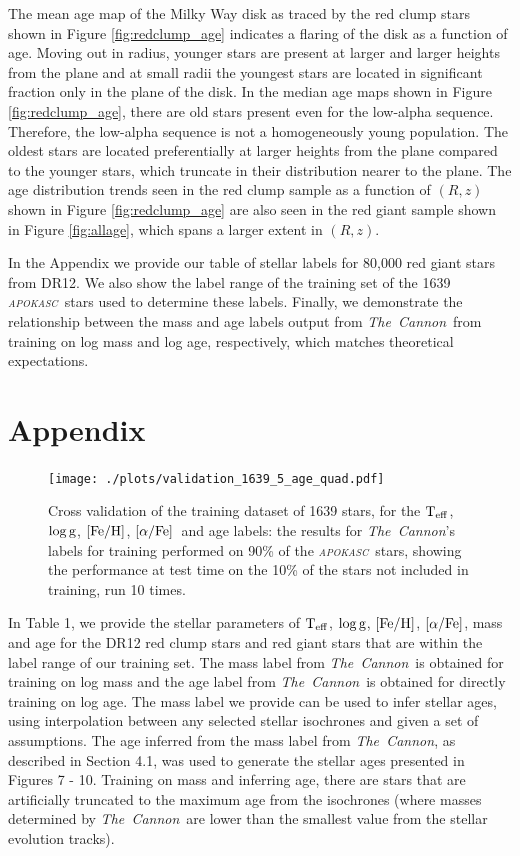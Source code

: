 \documentclass[12pt, preprint]{aastex}
\newcommand{\project}[1]{\textsl{#1}}
\newcommand{\tc}{\project{The~Cannon}}
\newcommand{\apokasc}{\project{\textsc{apokasc}}}
\newcommand{\teff}{\mbox{$\rm T_{eff}$}}
\newcommand{\feh}{\mbox{$\rm [Fe/H]$}}
\newcommand{\alphafe}{\mbox{$\rm [\alpha/Fe]$}}
\newcommand{\logg}{\mbox{$\rm \log g$}}
\begin{document}
The mean age map of the Milky Way disk as traced by the red clump stars shown in Figure \ref{fig:redclump_age} indicates a flaring of the disk as a function of age. Moving out in radius, younger stars are present at larger and larger heights from the plane and at small radii the youngest stars are located in significant fraction only in the plane of the disk. In the median age maps shown in Figure \ref{fig:redclump_age}, there are old stars present even for the low-alpha sequence. Therefore, the low-alpha sequence is not a homogeneously young population. The oldest stars are located preferentially at larger heights from the plane compared to the younger stars, which truncate in their distribution nearer to the plane. The age distribution trends seen in the red clump sample as a function of $(R,z)$ shown in Figure \ref{fig:redclump_age} are also seen in the red giant sample shown in Figure \ref{fig:allage}, which spans a larger extent in $(R,z)$. %

In the Appendix we provide our table of stellar labels for 80,000 red giant stars from DR12. We also show the label range of the training set of the 1639 \apokasc\ stars used to determine these labels. Finally, we demonstrate the relationship between the mass and age labels output from \tc\ from training on log mass and log age, respectively, which matches theoretical expectations. 


\section*{Appendix}

\begin{figure}[h]
\centering
        \texttt{[image: ./plots/validation\_1639\_5\_age\_quad.pdf]}
  \caption{Cross validation of the training dataset of 1639 stars, for the \teff, \logg, \feh, \alphafe\ and age labels: the results for \tc's labels for training performed on 90\% of the \apokasc\ stars, showing the performance at test time on the 10\% of the stars not included in training, run 10 times.}
\label{fig:validation2}
\end{figure}


In Table 1, we provide the stellar parameters of \teff, \logg, \feh, \alphafe, mass and age for the DR12 red clump stars and red giant stars that are within the label range of our training set. The mass label from \tc\ is obtained for training on log mass and the age label from \tc\ is obtained for directly training on log age.  The mass label we provide can be used to infer stellar ages, using interpolation between any selected stellar isochrones and given a set of assumptions. The age inferred from the mass label from \tc, as described in Section 4.1, was used to generate the stellar ages presented in Figures 7 - 10. Training on mass and inferring age, there are stars that are artificially truncated to the maximum age from the isochrones (where masses determined by \tc\ are lower than the smallest value from the stellar evolution tracks). 
\end{document}
